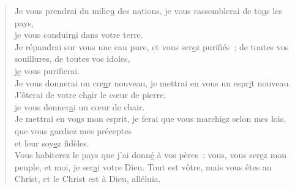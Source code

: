 \begin{verse}
Je vous prendrai du milie\underline{u} des nations, \psalmdagger
je vous rassemblerai de to\underline{u}s les pays,\\
je vous conduir\underline{a}i dans votre terre.\\

Je répandrai sur vous une eau pure,\psalmstar
et vous ser\underline{e}z purifiés ; \psalmstar
de toutes vos souillures, de toutes vos idoles,\\
j\underline{e} vous purifierai.\\

Je vous donnerai un cœ\underline{u}r nouveau,\psalmstar
je mettrai en vous un espr\underline{i}t nouveau.\\

J'ôterai de votre ch\underline{a}ir le cœur de pierre,\\
je vous donner\underline{a}i un cœur de chair.\\

Je mettrai en vo\underline{u}s mon esprit, \psalmdagger
je ferai que vous marchi\underline{e}z selon mes lois, \psalmstar
que vous gardiez mes préceptes\\
et leur soy\underline{e}z fidèles.\\

Vous habiterez le pays\psalmstar
que j'ai donn\underline{é} à vos pères : \psalmdagger
vous, vous ser\underline{e}z mon peuple, \psalmstar
et moi, je ser\underline{a}i votre Dieu.
Tout est vôtre, mais vous êtes au Christ, et le Christ est à Dieu, alléluia.
\end{verse}

